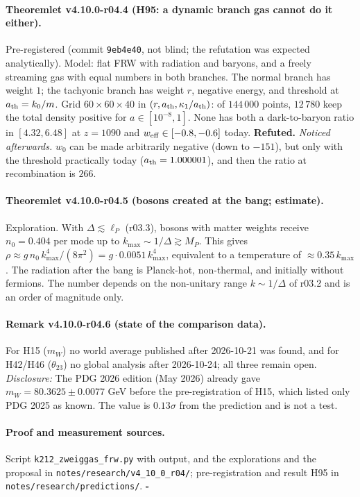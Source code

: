 \paragraph{Theoremlet v4.10.0-r04.4 (H95: a dynamic branch gas cannot do it either).}
Pre-registered (commit \texttt{9eb4e40}, not blind; the refutation was expected analytically).  Model: flat FRW with radiation and baryons, and a
freely streaming gas with equal numbers in both branches.  The normal branch has weight \(1\); the tachyonic branch has weight \(r\), negative
energy, and threshold at \(a_{\rm th}=k_0/m\).  Grid \(60\times60\times40\) in \((r,a_{\rm th},\kappa_1/a_{\rm th})\): of \(144\,000\) points, \(12\,780\) keep
the total density positive for \(a\in[10^{-8},1]\).  None has both a dark-to-baryon ratio in \([4.32,6.48]\) at \(z=1090\) and \(w_{\rm eff}\in[-0.8,-0.6]\)
today.  \textbf{Refuted.}
\emph{Noticed afterwards.}  \(w_0\) can be made arbitrarily negative (down to \(-151\)), but only with the threshold practically today
(\(a_{\rm th}=1.000001\)), and then the ratio at recombination is \(266\).

\paragraph{Theoremlet v4.10.0-r04.5 (bosons created at the bang; estimate).}
Exploration.  With \(\Delta\lesssim\ell_P\) (r03.3), bosons with matter weights receive \(n_0=0.404\) per mode up to \(k_{\max}\sim1/\Delta\gtrsim M_P\).  This
gives \(\rho\approx g\,n_0\,k_{\max}^4/(8\pi^2)=g\cdot0.0051\,k_{\max}^4\), equivalent to a temperature of \(\approx0.35\,k_{\max}\).  The radiation after the bang is
Planck-hot, non-thermal, and initially without fermions.  The number depends on the non-unitary range \(k\sim1/\Delta\) of r03.2 and is an order of
magnitude only.

\paragraph{Remark v4.10.0-r04.6 (state of the comparison data).}
For H15 (\(m_W\)) no world average published after 2026-10-21 was found, and for H42/H46 (\(\theta_{23}\)) no global analysis after 2026-10-24; all three
remain open.  \emph{Disclosure:} The PDG 2026 edition (May 2026) already gave \(m_W=80.3625\pm0.0077\) GeV before the pre-registration of H15, which
listed only PDG 2025 as known.  The value is \(0.13\sigma\) from the prediction and is not a test.

\paragraph{Proof and measurement sources.}
Script \texttt{k212\_\allowbreak zweiggas\_\allowbreak frw.py} with output, and the explorations and the proposal in
\texttt{notes/\allowbreak research/\allowbreak v4\_10\_0\_r04/}; pre-registration and result H95 in \texttt{notes/\allowbreak research/\allowbreak predictions/}.  \(\square\)

